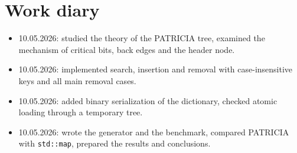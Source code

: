 \section{Work diary}

\begin{itemize}
    \item 10.05.2026: studied the theory of the PATRICIA tree, examined the mechanism of critical
    bits, back edges and the header node.
    \item 10.05.2026: implemented search, insertion and removal with case-insensitive keys and all
    main removal cases.
    \item 10.05.2026: added binary serialization of the dictionary, checked atomic loading through
    a temporary tree.
    \item 10.05.2026: wrote the generator and the benchmark, compared PATRICIA with
    \texttt{std::map}, prepared the results and conclusions.
\end{itemize}

\pagebreak
